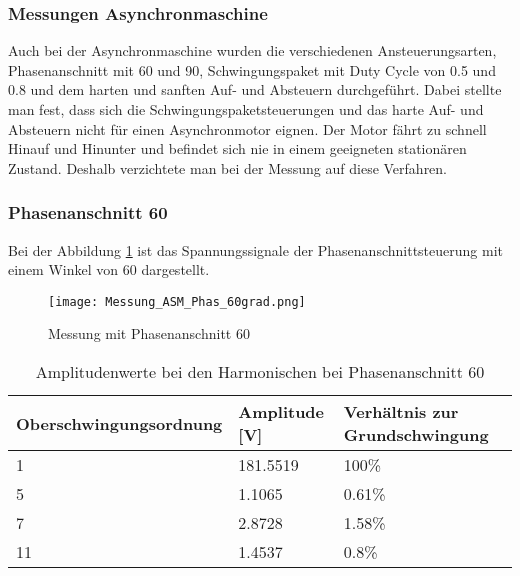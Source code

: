 \subsubsection{Messungen Asynchronmaschine}

Auch bei der Asynchronmaschine wurden die verschiedenen Ansteuerungsarten, Phasenanschnitt mit 60\textdegree \hspace{0.02cm} und 90\textdegree \hspace{0.02cm}, Schwingungspaket mit Duty Cycle von 0.5 und 0.8 und dem harten und sanften Auf- und Absteuern durchgeführt. Dabei stellte man fest, dass sich die Schwingungspaketsteuerungen und das harte Auf- und Absteuern nicht für einen Asynchronmotor eignen. Der Motor fährt zu schnell Hinauf und Hinunter und befindet sich nie in einem geeigneten stationären Zustand. Deshalb verzichtete man bei der Messung auf diese Verfahren.

\subsubsection*{Phasenanschnitt 60\textdegree}

Bei der Abbildung \ref{fig:Mess_ASM_Phas60} ist das Spannungssignale der Phasenanschnittsteuerung mit einem Winkel von 60\textdegree\hspace{0.02cm} dargestellt.

\begin{figure}[ht!]
	\centering
	\texttt{[image: Messung\_ASM\_Phas\_60grad.png]}	
	\caption{Messung mit Phasenanschnitt 60\textdegree}\label{fig:Mess_ASM_Phas60}
\end{figure}


\newpage
\begin{table}[ht!]
	\centering
	\begin{tabular}{|l|l|l|}
		\hline
		Oberschwingungsordnung & Amplitude {[}V{]} & Verhältnis zur Grundschwingung \\ \hline
		1                      & 181.5519          & 100\%                          \\ \hline
		5                      & 1.1065            & 0.61\%                         \\ \hline
		7                      & 2.8728            & 1.58\%                         \\ \hline
		11                     & 1.4537            & 0.8\%                          \\ \hline
	\end{tabular}
\caption{Amplitudenwerte bei den Harmonischen bei Phasenanschnitt 60\textdegree}\label{tab:Mess_Spannung_ASM_Phas60}
\end{table}


